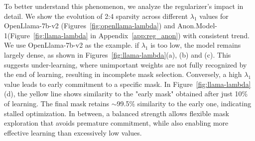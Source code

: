 To better understand this phenomenon, we analyze the regularizer's impact in detail. We show the evolution of 2:4 sparsity across different $\lambda_{1}$ values for OpenLlama-7b-v2 (Figures~\ref{fig:openllama-lambda}) and Anon.Model-1(Figure~\ref{fig:llama-lambda} in Appendix~\ref{app:reg_anon}) with consistent trend. We use OpenLlama-7b-v2 as the example. if $\lambda_{1}$ is too low, the model remains largely dense, as shown in Figures~\ref{fig:llama-lambda}(a), (b) and (c). This suggests under-learning, where unimportant weights are not fully recognized by the end of learning, resulting in incomplete mask selection. 
Conversely, a high $\lambda_{1}$ value leads to early commitment to a specific mask. In Figure~\ref{fig:llama-lambda}(d), the yellow line shows similarity to the "early mask" obtained after just 10\% of learning. The final mask retains $\sim$99.5\% similarity to the early one, indicating stalled optimization.
In between, a balanced strength allows flexible mask exploration that avoids premature commitment, while also enabling more effective learning than excessively low values.



\begin{table}[!t]
\centering
\caption{
Wikitext PPL across $\lambda_{1}$.
Optimal performance occurs at balanced regularization. Bold indicates the best performance.}
\label{tab: reg_1}
\vspace{0.5em}
\vspace{-1.5em}
\end{table}


